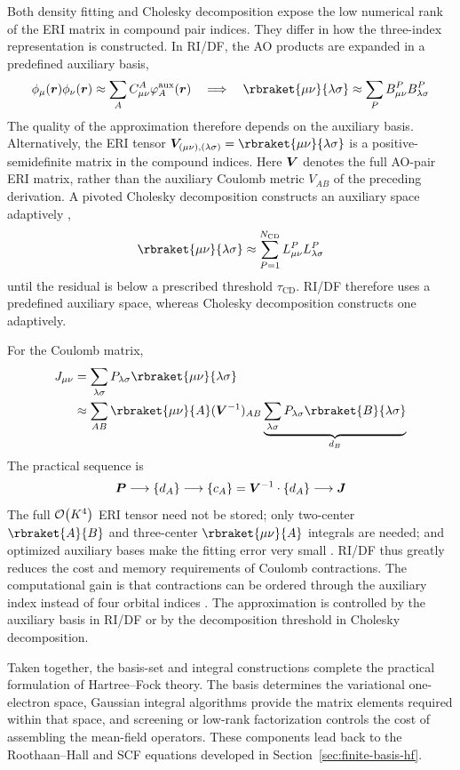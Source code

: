 Both density fitting and Cholesky decomposition expose the low numerical rank
of the ERI matrix in compound pair indices. They differ in how the
three-index representation is constructed.
In RI/DF, the AO products are expanded in a predefined auxiliary basis,
\begin{equation}
 \phi_\mu(\br)\phi_\nu(\br)
 \approx\sum_AC_{\mu\nu}^A\varphi_A^\text{aux}(\br)
 \quad\Longrightarrow\quad
 \rbraket{\mu\nu}{\lambda\sigma}
 \approx\sum_PB_{\mu\nu}^PB_{\lambda\sigma}^P
\end{equation}
The quality of the approximation therefore depends on the auxiliary basis.
Alternatively, the ERI tensor
$\bV_{(\mu\nu),(\lambda\sigma)}=\rbraket{\mu\nu}{\lambda\sigma}$ is a
positive-semidefinite matrix in the compound indices. Here $\boldsymbol{V}$ denotes the
full AO-pair ERI matrix, rather than the auxiliary Coulomb metric
$V_{AB}$ of the preceding derivation. A pivoted Cholesky
decomposition constructs an auxiliary space adaptively
\citep{BeebeLinderberg1977},
\begin{equation}
 \rbraket{\mu\nu}{\lambda\sigma}
 \approx\sum_{P=1}^{N_\text{CD}}L_{\mu\nu}^PL_{\lambda\sigma}^P
\end{equation}
until the residual is below a prescribed threshold $\tau_\text{CD}$. RI/DF
therefore uses a predefined auxiliary space, whereas Cholesky decomposition
constructs one adaptively.

For the Coulomb matrix,
\begin{equation}
\begin{split}
 J_{\mu\nu}
 &=\sum_{\lambda\sigma}P_{\lambda\sigma}
 \rbraket{\mu\nu}{\lambda\sigma}\\
 &\approx\sum_{AB}\rbraket{\mu\nu}{A}(\bV^{-1})_{AB}
 \underbrace{\sum_{\lambda\sigma}P_{\lambda\sigma}
 \rbraket{B}{\lambda\sigma}}_{d_B}
\end{split}
\end{equation}
The practical sequence is
\begin{equation}
 \boldsymbol{P}\longrightarrow\{d_A\}\longrightarrow
 \{c_A\}=\boldsymbol{V}^{-1}\cdot\{d_A\}\longrightarrow\boldsymbol{J}
\end{equation}
The full $\order{K^4}$ ERI tensor need not be stored; only two-center
$\rbraket{A}{B}$ and three-center $\rbraket{\mu\nu}{A}$ integrals are needed;
and optimized auxiliary bases make the fitting error very small
\citep{Weigend2006}. RI/DF thus greatly reduces the cost and memory
requirements of Coulomb contractions.
The computational gain is that contractions can be ordered through the
auxiliary index instead of four orbital indices \citep{Weigend2002}. The approximation is
controlled by the auxiliary basis in RI/DF or by the decomposition threshold
in Cholesky decomposition.

Taken together, the basis-set and integral constructions complete the
practical formulation of Hartree--Fock theory. The basis determines the
variational one-electron space, Gaussian integral algorithms provide the
matrix elements required within that space, and screening or low-rank
factorization controls the cost of assembling the mean-field operators. These
components lead back to the Roothaan--Hall and SCF equations developed in
Section~\ref{sec:finite-basis-hf}.
